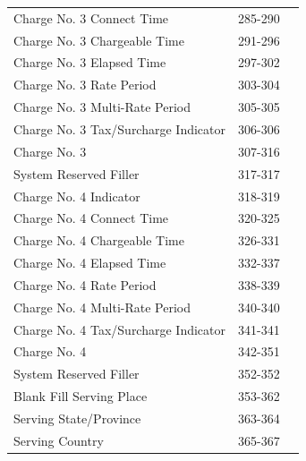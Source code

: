\documentclass[12pt,twoside]{article}
\begin{document}
\begin{longtable}{lrr}
 Charge No. 3 Connect Time                 &            285-290  &                        \\
 Charge No. 3 Chargeable Time              &            291-296  &                        \\
 Charge No. 3 Elapsed Time                 &            297-302  &                        \\
 Charge No. 3 Rate Period                  &            303-304  &                        \\
 Charge No. 3 Multi-Rate Period            &            305-305  &                        \\
 Charge No. 3 Tax/Surcharge Indicator      &            306-306  &                        \\
 Charge No. 3                              &            307-316  &                        \\
 System Reserved Filler                    &            317-317  &                        \\
 Charge No. 4 Indicator                    &            318-319  &                        \\
 Charge No. 4 Connect Time                 &            320-325  &                        \\
 Charge No. 4 Chargeable Time              &            326-331  &                        \\
 Charge No. 4 Elapsed Time                 &            332-337  &                        \\
 Charge No. 4 Rate Period                  &            338-339  &                        \\
 Charge No. 4 Multi-Rate Period            &            340-340  &                        \\
 Charge No. 4 Tax/Surcharge Indicator      &            341-341  &                        \\
 Charge No. 4                              &            342-351  &                        \\
 System Reserved Filler                    &            352-352  &                        \\
 Blank Fill Serving Place                  &            353-362  &                        \\
 Serving State/Province                    &            363-364  &                        \\
 Serving Country                           &            365-367  &                        \\

\end{longtable}
\end{document}
